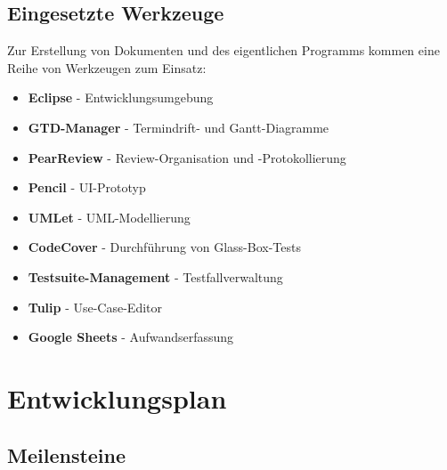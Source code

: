 \documentclass[11pt]{article}
\begin{document}
\subsection{Eingesetzte Werkzeuge}

Zur Erstellung von Dokumenten und des eigentlichen Programms kommen eine Reihe von Werkzeugen zum Einsatz:

\begin{itemize}
	\item \textbf{Eclipse} - Entwicklungsumgebung
	\item \textbf{GTD-Manager} - Termindrift- und Gantt-Diagramme
	\item \textbf{PearReview} - Review-Organisation und -Protokollierung
	\item \textbf{Pencil} - UI-Prototyp
	\item \textbf{UMLet} - UML-Modellierung
	\item \textbf{CodeCover} - Durchführung von Glass-Box-Tests
	\item \textbf{Testsuite-Management} - Testfallverwaltung
	\item \textbf{Tulip} - Use-Case-Editor
	\item \textbf{Google Sheets} - Aufwandserfassung
\end{itemize}

\newpage

\section{Entwicklungsplan}

\subsection{Meilensteine}
\end{document}
